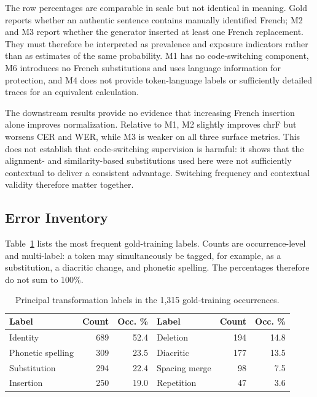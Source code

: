 \documentclass[12pt, a4paper, twoside, openany]{report}
\begin{document}
The row percentages are comparable in scale but not identical in meaning. Gold reports whether an authentic sentence contains manually identified French; M2 and M3 report whether the generator inserted at least one French replacement. They must therefore be interpreted as prevalence and exposure indicators rather than as estimates of the same probability. M1 has no code-switching component, M6 introduces no French substitutions and uses language information for protection, and M4 does not provide token-language labels or sufficiently detailed traces for an equivalent calculation.

The downstream results provide no evidence that increasing French insertion alone improves normalization. Relative to M1, M2 slightly improves chrF but worsens CER and WER, while M3 is weaker on all three surface metrics. This does not establish that code-switching supervision is harmful: it shows that the alignment- and similarity-based substitutions used here were not sufficiently contextual to deliver a consistent advantage. Switching frequency and contextual validity therefore matter together.

\subsection{Error Inventory}

Table~\ref{tab:gold-errors-main} lists the most frequent gold-training labels. Counts are occurrence-level and multi-label: a token may simultaneously be tagged, for example, as a substitution, a diacritic change, and phonetic spelling. The percentages therefore do not sum to 100\%.

\begin{table}[H]
	\centering
	\caption{Principal transformation labels in the 1,315 gold-training occurrences.}
	\label{tab:gold-errors-main}
	\small
	\begin{tabular}{lrr@{\qquad}lrr}
		\toprule
		\textbf{Label} & \textbf{Count} & \textbf{Occ. \%} & \textbf{Label} & \textbf{Count} & \textbf{Occ. \%} \\
		\midrule
		Identity & 689 & 52.4 & Deletion & 194 & 14.8 \\
		Phonetic spelling & 309 & 23.5 & Diacritic & 177 & 13.5 \\
		Substitution & 294 & 22.4 & Spacing merge & 98 & 7.5 \\
		Insertion & 250 & 19.0 & Repetition & 47 & 3.6 \\
		\bottomrule
	\end{tabular}
\end{table}
\end{document}
